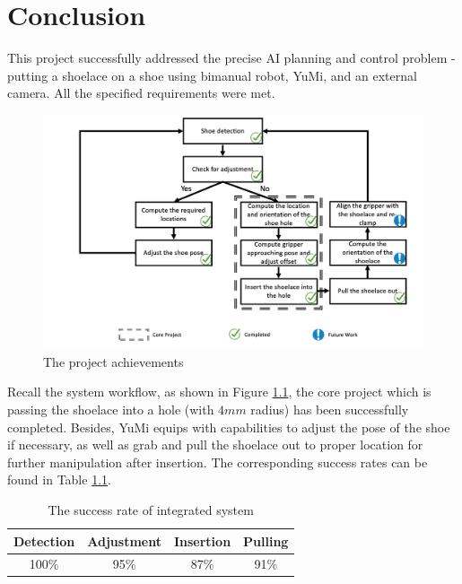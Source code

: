 \chapter{Conclusion}

This project successfully addressed the precise AI planning and control problem - putting a shoelace on a shoe using bimanual robot, YuMi, and an external camera. All the specified requirements were met.

\begin{figure}[H]
\centering
\includegraphics[width = \columnwidth]{conclusion/workflowcon.png}
\caption{The project achievements}
\label{workflowcon}
\end{figure}

Recall the system workflow, as shown in Figure \ref{workflowcon}, the core project which is passing the shoelace into a hole (with $4mm$ radius) has been successfully completed. Besides, YuMi equips with capabilities to adjust the pose of the shoe if necessary, as well as grab and pull the shoelace out to proper location for further manipulation after insertion. The corresponding success rates can be found in Table \ref{sris}.

\begin{table}[H]
\centering
\begin{tabular}{||c|c|c|c||}
\hline
Detection & Adjustment & Insertion & Pulling \\ \hline\hline
100\% & 95\% & 87\% & 91\% \\ \hline
\end{tabular}
\caption{The success rate of integrated system}
\label{sris}
\end{table}

